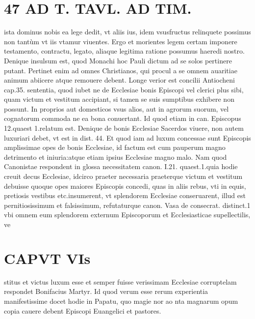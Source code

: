 \documentclass{article}
\begin{document}
\begin{pages}
\section*{47 AD T. TAVL. AD TIM. }\pstart ista dominus nobis ea lege dedit, vt aliis ius, idem vsusfructus relinquete possimus non tantùm vt iis vtamur viuentes. Ergo et morientes legem certam imponere testamento, contractu, legato, aliaque legitima ratione possumus haeredi nostro.  \pend\pstart Denique insulsum est, quod Monachi hoc Pauli dictum ad se solos pertinere putant. Pertinet enim ad omnes Christianos, qui procul a se omnem auaritiae animum abiicere atque remouere debent. Longe verior est concilii Antiocheni cap.35. sententia, quod iubet ne de Ecclesiae bonis Episcopi vel clerici plus sibi, quam victum et vestitum accipiant, si tamen se suis sumptibus exhibere non possunt. In proprios aut domesticos vsus alios, aut in agrorum suorum, vel cognatorum commoda ne ea bona conuertant. Id quod etiam in can. Episcopus 12.quaest 1.relatum est. Denique  de bonis Ecclesiae Sacerdos viuere, non autem luxuriari debet, vt est in dist. 44. Et quod iam ad luxum concessae sunt Episcopis amplissimae opes de bonis Ecclesiae, id factum est cum pauperum magno detrimento et iniuria:atque etiam ipsius Ecclesiae magno malo. Nam quod Canonistae respondent in glossa necessitatem canon. I.21. quaest.1.quia hodie creuit decus Ecclesiae, idcirco praeter necessaria praeterque victum et vestitum debuisse quoque opes maiores Episcopis concedi, quas in aliis rebus, vti in equis, pretiosis vestibus etc.insumerent, vt splendorem Ecclesiae conseruarent, illud est pernitiosissimum et falsissimum, refutaturque canon. Vasa de consecrat. distinct.1 vbi omnem eum splendorem externum Episcoporum et Ecclesiasticae supellectilis, ve\pend
\section*{CAPVT  VIs }
\marginpar{[ p.445 ]}\pstart stitus et victus luxum esse et semper fuisse verissimam Ecclesiae corruptelam respondet Bonifacius Martyr. Id quod verum esse rerum experientia manifestissime docet hodie in Papatu, quo magie nor ao nta magnarum opum copia cauere debent Episcopi Euangelici et pastores.  \pend
{}
{}

\end{pages}
\end{document}
